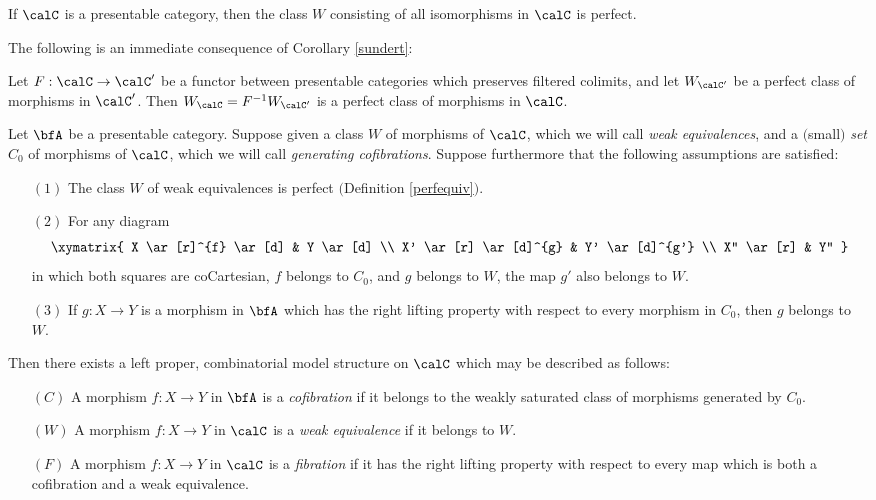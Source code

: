 \begin{example}
If $\calC$ is a presentable category, then the class $W$ consisting of all isomorphisms in $\calC$
is perfect.
\end{example}

The following is an immediate consequence of Corollary \ref{sundert}:

\begin{corollary}\label{perfpull}
Let $F: \calC \rightarrow \calC'$ be a functor between presentable categories which preserves filtered colimits, and let $W_{\calC'}$ be a perfect class of morphisms in $\calC'$. Then
$W_{\calC} = F^{-1} W_{\calC'}$ is a perfect class of morphisms in $\calC$.
\end{corollary}

\begin{proposition}\label{goot}
Let $\bfA$ be a presentable category. Suppose given a class $W$ of morphisms of $\calC$, which we will call {\it weak equivalences}, and a $($small$)$ {\em set} $C_0$ of morphisms of $\calC$, which we will call {\it generating cofibrations}. Suppose furthermore that the following assumptions are satisfied:

\begin{itemize}
\item[$(1)$] The class $W$ of weak equivalences is perfect $($Definition \ref{perfequiv}$)$.
\item[$(2)$] For any diagram
$$ \xymatrix{ X \ar[r]^{f} \ar[d] & Y \ar[d] \\
	X' \ar[r] \ar[d]^{g} & Y' \ar[d]^{g'} \\
	X'' \ar[r] & Y'' } $$
in which both squares are coCartesian, $f$ belongs to $C_0$, and $g$ belongs to $W$, 
the map $g'$ also belongs to $W$.
\item[$(3)$] If $g: X \rightarrow Y$ is a morphism in $\bfA$ which has the right lifting property with respect to every morphism in $C_0$, then $g$ belongs to $W$. 
\end{itemize}

Then there exists a left proper, combinatorial model structure on $\calC$ which may be described as follows:

\begin{itemize}
\item[$(C)$] A morphism $f: X \rightarrow Y$ in $\bfA$ is a {\it cofibration} if it belongs to the weakly saturated class of morphisms generated by $C_0$.
\item[$(W)$] A morphism $f: X \rightarrow Y$ in $\calC$ is a {\it weak equivalence} if it belongs to $W$.
\item[$(F)$] A morphism $f: X \rightarrow Y$ in $\calC$ is a {\it fibration} if it has the right lifting property with respect to every map which is both a cofibration and a weak equivalence.
\end{itemize}
\end{proposition}

